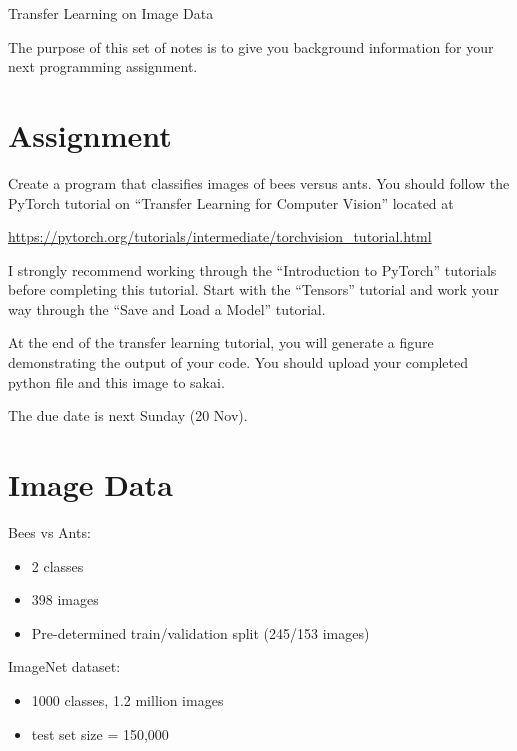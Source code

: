 \documentclass[10pt]{exam}
\theoremstyle{definition}
\begin{document}
\begin{center}
{
\Huge
Transfer Learning on Image Data
}
\end{center}

The purpose of this set of notes is to give you background information for your next programming assignment.

\section{Assignment}

Create a program that classifies images of bees versus ants.
You should follow the PyTorch tutorial on ``Transfer Learning for Computer Vision'' located at

\url{https://pytorch.org/tutorials/intermediate/torchvision_tutorial.html}

\noindent
I strongly recommend working through the ``Introduction to PyTorch'' tutorials before completing this tutorial.
Start with the ``Tensors'' tutorial and work your way through the ``Save and Load a Model'' tutorial.

At the end of the transfer learning tutorial, you will generate a figure demonstrating the output of your code.
You should upload your completed python file and this image to sakai.

The due date is next Sunday (20 Nov).

\section{Image Data}

Bees vs Ants:

\begin{itemize}
\item 2 classes

\item 398 images

\item Pre-determined train/validation split (245/153 images)
\end{itemize}

\noindent
ImageNet dataset:

\begin{itemize}
    \item 1000 classes, 1.2 million images

    \item test set size = 150,000

\end{itemize}
\end{document}
